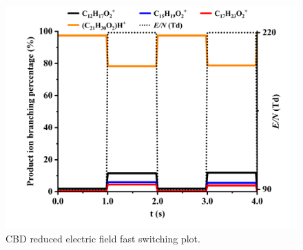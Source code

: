 \begin{figure}[htb]
\centering
\includegraphics[width=0.8\linewidth]{pics/other_drugs/CBD-fs-90-220.png}
\caption{CBD reduced electric field fast switching plot.}
\label{fig:DR_CBD_fs}
\end{figure}














